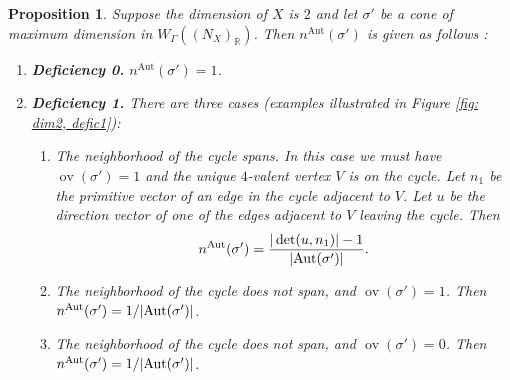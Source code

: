 \documentclass{article}
\def\Aut{{\rm Aut}}
\newtheorem{proposition}[definition]{Proposition}
\newcommand{\ov}[1]{\operatorname{ov}(#1)}
\newcommand{\nn}{n^{\operatorname{Aut}}}
\begin{document}
\begin{proposition} \label{thm:mult2}
    Suppose the dimension of $X$ is $2$ and let $\sigma'$ be a cone of maximum dimension in $W_{\Gamma}((N_X)_{\mathbb{R}})$. Then $\nn(\sigma')$ is given as follows :
    \begin{enumerate}
        \item \textbf{Deficiency 0.} $\nn(\sigma') = 1$.
        \item \textbf{Deficiency 1.}  There are three cases (examples illustrated in Figure \ref{fig: dim2, defic1}):
            \begin{enumerate}
                \item The neighborhood of the cycle spans. In this case we must have $\ov{\sigma'} = 1$ and the unique $4$-valent vertex $V$ is on the cycle. Let $n_1$ be the primitive vector of an edge in the cycle adjacent to $V$. Let $u$ be the direction vector of one of the edges adjacent to $V$ leaving the cycle. Then 
                $$\nn(\sigma') = \frac{|\det(u, n_1)| - 1}{|\Aut(\sigma')|}.$$ 
                \item The neighborhood of the cycle does not span, and $\ov{\sigma'} = 1$. Then $\nn(\sigma') = 1/|\Aut(\sigma')|$. 
                \item The neighborhood of the cycle does not span, and $\ov{\sigma'} = 0$. Then $\nn(\sigma') = 1/|\Aut(\sigma')|$. 

                \begin{figure}[h]
                \centering
                \begin{subfigure}[t]{0.3\textwidth}
            		\centering
\end{subfigure}
\end{figure}
\end{enumerate}
\end{enumerate}
\end{proposition}
\end{document}
